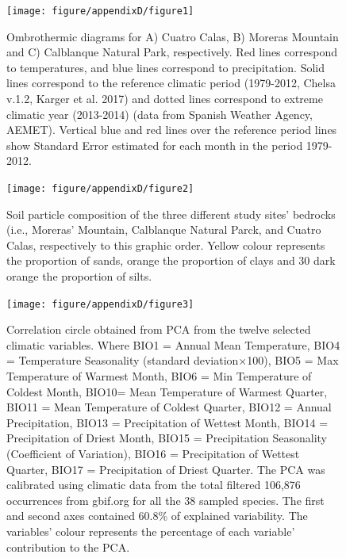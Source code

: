 \documentclass[11pt,twoside]{reedthesis}
\begin{document}
\setlength{\abovecaptionskip}{10pt}
\begin{figure}[hbt!]

{\centering \texttt{[image: figure/appendixD/figure1]} 

}

\caption[Ombrothermic diagrams for the study site]{Ombrothermic diagrams for A) Cuatro Calas, B) Moreras Mountain and C) Calblanque Natural Park, respectively. Red lines correspond to temperatures, and blue lines correspond to precipitation. Solid lines correspond to the reference climatic period (1979-2012, Chelsa v.1.2, Karger et al. 2017) and dotted lines correspond to extreme climatic year (2013-2014) (data from Spanish Weather Agency, AEMET). Vertical blue and red lines over the reference period lines show Standard Error estimated for each month in the period 1979-2012.}\label{fig:unnamed-chunk-17}
\end{figure}\newpage
\begin{figure}[hbt!]

{\centering \texttt{[image: figure/appendixD/figure2]} 

}

\caption[Soil particle composition of the study sites]{Soil particle composition of the three different study sites’ bedrocks (i.e., Moreras’ Mountain, Calblanque Natural Parck, and Cuatro Calas, respectively to this graphic order. Yellow colour represents the proportion of sands, orange the proportion of clays and 30 dark orange the proportion of silts.}\label{fig:unnamed-chunk-18}
\end{figure}\newpage
\begin{figure}[hbt!]

{\centering \texttt{[image: figure/appendixD/figure3]} 

}

\caption[Correlation circle obtained from PCA from the twelve selected climatic variables.]{Correlation circle obtained from PCA from the twelve selected climatic variables. Where BIO1 = Annual Mean Temperature, BIO4 = Temperature Seasonality (standard deviation×100), BIO5 = Max Temperature of Warmest Month, BIO6 = Min Temperature of Coldest Month, BIO10= Mean Temperature of Warmest Quarter, BIO11 = Mean Temperature of Coldest Quarter, BIO12 = Annual Precipitation, BIO13 = Precipitation of Wettest Month, BIO14 = Precipitation of Driest Month, BIO15 = Precipitation Seasonality (Coefficient of Variation), BIO16 = Precipitation of Wettest Quarter, BIO17 = Precipitation of Driest Quarter. The PCA was calibrated using climatic data from the total filtered 106,876 occurrences from gbif.org for all the 38 sampled species. The first and second axes contained 60.8\% of explained variability. The variables' colour represents the percentage of each variable' contribution to the PCA.}\label{fig:unnamed-chunk-19}
\end{figure}\newpage
\end{document}
